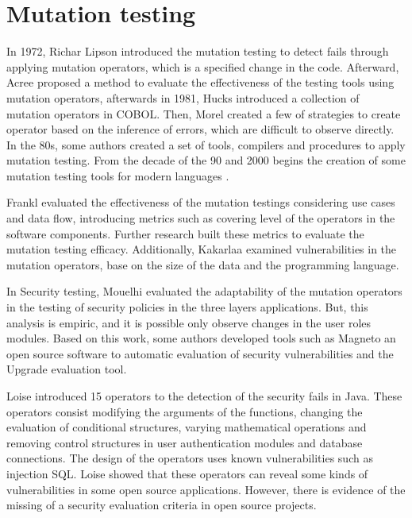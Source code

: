\section{Mutation testing} \label{sec:mutation-testing}

In 1972, Richar Lipson introduced the mutation testing\cite{lipton1971fault} to detect fails through applying mutation operators, which is a specified change in the code. Afterward, Acree\cite{10.5555/909622} proposed a method to evaluate the effectiveness of the testing tools using mutation operators, afterwards in 1981, Hucks\cite{Hanks80} introduced a collection of mutation operators in COBOL. Then, Morel\cite{10.5555/911352} created a few of strategies to create operator based on the inference of errors, which are difficult to observe directly. In the 80s, some authors created a set of tools, compilers and procedures to apply mutation testing\cite{10.5555/914857, Offutt1987}. From the decade of the 90 and 2000 begins the creation of some mutation testing tools for modern languages \cite{92910,170202, Maldonado2001}.

Frankl\cite{Frankl1991,Frankl1993} evaluated the effectiveness of the mutation testings considering use cases and data flow, introducing metrics such as covering level of the operators in the software components. Further research\cite{Offutt1996,Frankl1997,Frankl1998} built these metrics to evaluate the mutation testing efficacy. Additionally, Kakarlaa\cite{Kakarla2011} examined vulnerabilities in the mutation operators, base on the size of the data and the programming language.

In Security testing, Mouelhi\cite{Mouelhi2007} evaluated the adaptability of the mutation operators in the testing of security policies in the three layers applications. But, this analysis is empiric, and it is possible only observe changes in the user roles modules. Based on this work, some authors developed tools such as Magneto\cite{Thomas2011} an open source software to automatic evaluation of security vulnerabilities and the Upgrade evaluation tool\cite{ozdemir2019upgrade}.

Loise\cite{Loise2017} introduced 15 operators to the detection of the security fails in Java. These operators consist modifying the arguments of the functions, changing the evaluation of conditional structures, varying mathematical operations and removing control structures in user authentication modules and database connections. The design of the operators uses known vulnerabilities such as injection SQL. Loise showed that these operators can reveal some kinds of vulnerabilities in some open source applications. However, there is evidence of the missing of a security evaluation criteria in open source projects.

